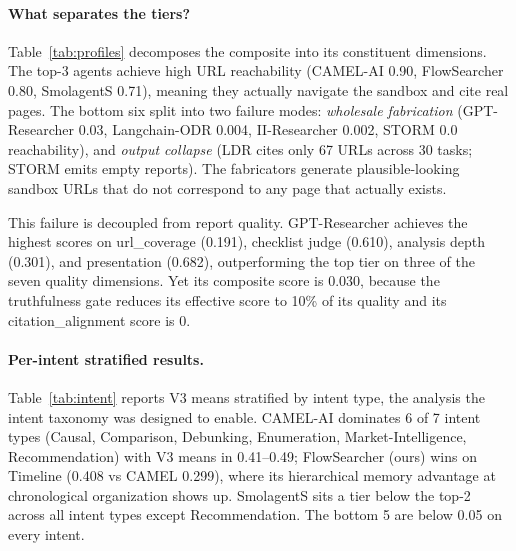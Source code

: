 \documentclass{article}
\begin{document}
\paragraph{What separates the tiers?} Table~\ref{tab:profiles} decomposes the composite into its constituent dimensions. The top-3 agents achieve high URL reachability (CAMEL-AI 0.90, FlowSearcher 0.80, SmolagentS 0.71), meaning they actually navigate the sandbox and cite real pages. The bottom six split into two failure modes: \emph{wholesale fabrication} (GPT-Researcher 0.03, Langchain-ODR 0.004, II-Researcher 0.002, STORM 0.0 reachability), and \emph{output collapse} (LDR cites only 67 URLs across 30 tasks; STORM emits empty reports). The fabricators generate plausible-looking sandbox URLs that do not correspond to any page that actually exists.

This failure is decoupled from report quality. GPT-Researcher achieves the highest scores on url\_coverage (0.191), checklist judge (0.610), analysis depth (0.301), and presentation (0.682), outperforming the top tier on three of the seven quality dimensions. Yet its composite score is 0.030, because the truthfulness gate reduces its effective score to 10\% of its quality and its citation\_alignment score is 0.

\paragraph{Per-intent stratified results.} Table~\ref{tab:intent} reports V3 means stratified by intent type, the analysis the intent taxonomy was designed to enable. CAMEL-AI dominates 6 of 7 intent types (Causal, Comparison, Debunking, Enumeration, Market-Intelligence, Recommendation) with V3 means in 0.41--0.49; FlowSearcher (ours) wins on Timeline (0.408 vs CAMEL 0.299), where its hierarchical memory advantage at chronological organization shows up. SmolagentS sits a tier below the top-2 across all intent types except Recommendation. The bottom 5 are below 0.05 on every intent.
\end{document}
